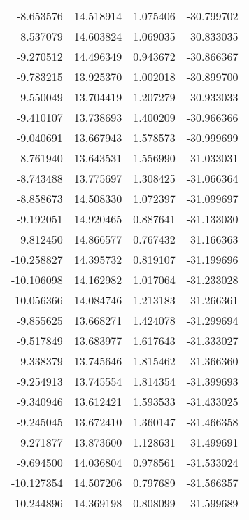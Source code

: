 \begin{tabular}{rrrr}
       -8.653576 &        14.518914 &    1.075406 & -30.799702 \\
       -8.537079 &        14.603824 &    1.069035 & -30.833035 \\
       -9.270512 &        14.496349 &    0.943672 & -30.866367 \\
       -9.783215 &        13.925370 &    1.002018 & -30.899700 \\
       -9.550049 &        13.704419 &    1.207279 & -30.933033 \\
       -9.410107 &        13.738693 &    1.400209 & -30.966366 \\
       -9.040691 &        13.667943 &    1.578573 & -30.999699 \\
       -8.761940 &        13.643531 &    1.556990 & -31.033031 \\
       -8.743488 &        13.775697 &    1.308425 & -31.066364 \\
       -8.858673 &        14.508330 &    1.072397 & -31.099697 \\
       -9.192051 &        14.920465 &    0.887641 & -31.133030 \\
       -9.812450 &        14.866577 &    0.767432 & -31.166363 \\
      -10.258827 &        14.395732 &    0.819107 & -31.199696 \\
      -10.106098 &        14.162982 &    1.017064 & -31.233028 \\
      -10.056366 &        14.084746 &    1.213183 & -31.266361 \\
       -9.855625 &        13.668271 &    1.424078 & -31.299694 \\
       -9.517849 &        13.683977 &    1.617643 & -31.333027 \\
       -9.338379 &        13.745646 &    1.815462 & -31.366360 \\
       -9.254913 &        13.745554 &    1.814354 & -31.399693 \\
       -9.340946 &        13.612421 &    1.593533 & -31.433025 \\
       -9.245045 &        13.672410 &    1.360147 & -31.466358 \\
       -9.271877 &        13.873600 &    1.128631 & -31.499691 \\
       -9.694500 &        14.036804 &    0.978561 & -31.533024 \\
      -10.127354 &        14.507206 &    0.797689 & -31.566357 \\
      -10.244896 &        14.369198 &    0.808099 & -31.599689 \\

\end{tabular}
